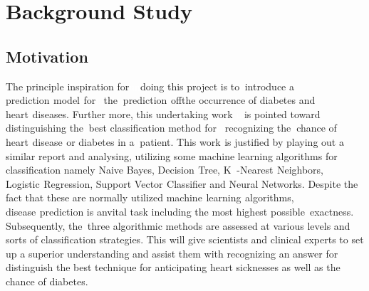 \documentclass[oneside,12pt]{Classes/VTU}
\begin{document}
    \section{Background Study}
    \subsection{Motivation}

    The principle inspiration for\tiny\textcolor{white}{un}\normalsize doing this project is to\tiny\textcolor{white}{o}\normalsize introduce a prediction\tiny\textcolor{white}{s}\normalsize model\tiny\textcolor{white}{s}\normalsize for\tiny\textcolor{white}{m}\normalsize the\tiny\textcolor{white}{n}\normalsize prediction\tiny\textcolor{white}{s}\normalsize of\tiny\textcolor{white}{f}\normalsize the occurrence of diabetes and heart\tiny\textcolor{white}{s}\normalsize diseases. Further more, this undertaking work \tiny\textcolor{white}{m}\normalsize is pointed toward distinguishing the\tiny\textcolor{white}{n}\normalsize best classification method for\tiny\textcolor{white}{m}\normalsize recognizing the\tiny\textcolor{white}{n}\normalsize chance of heart\tiny\textcolor{white}{s}\normalsize disease\tiny\textcolor{white}{s}\normalsize or diabetes in a\tiny\textcolor{white}{n}\normalsize patient. This work\tiny\textcolor{white}{s}\normalsize is justified by playing out a similar report and analysing, utilizing some machine learning algorithms for classification namely Naive Bayes, Decision\tiny\textcolor{white}{s}\normalsize Tree, K\tiny\textcolor{white}{n}\normalsize-Nearest\tiny\textcolor{white}{s}\normalsize Neighbors, Logistic\tiny\textcolor{white}{s}\normalsize Regression, Support Vector\tiny\textcolor{white}{s}\normalsize Classifier and Neural Networks. Despite the fact that these are normally utilized machine\tiny\textcolor{white}{s}\normalsize learning\tiny\textcolor{white}{s}\normalsize algorithms, disease\tiny\textcolor{white}{s}\normalsize prediction is anvital task including the most highest possible\tiny\textcolor{white}{y}\normalsize exactness. Subsequently, the\tiny\textcolor{white}{n}\normalsize three algorithmic methods are assessed at various levels and sorts of classification strategies. This will give scientists and clinical experts to set up a superior understanding and assist them with recognizing an answer for distinguish the best technique for anticipating heart sicknesses as well as the chance of diabetes.
\end{document}
